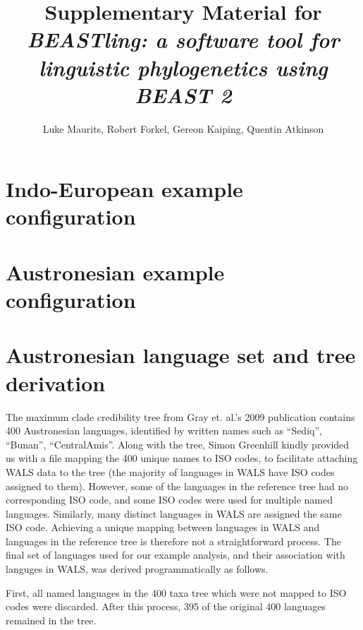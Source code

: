 \documentclass[10pt,a4paper]{article}
\begin{document}
\title{Supplementary Material for \emph{BEASTling: a software tool for linguistic phylogenetics using BEAST 2}}
\author{Luke Maurits, Robert Forkel, Gereon Kaiping, Quentin Atkinson}
\maketitle

\section{Indo-European example configuration}

\begin{alltt}

\end{alltt}

\section{Austronesian example configuration}

\begin{alltt}

\end{alltt}

\section{Austronesian language set and tree derivation}

The maximum clade credibility tree from Gray et. al.'s 2009 publication contains 400 Austronesian languages, identified by written names such as ``Sediq'', ``Bunan'', ``CentralAmis''.  Along with the tree, Simon Greenhill kindly provided us with a file mapping the 400 unique names to ISO codes, to facilitate attaching WALS data to the tree (the majority of languages in WALS have ISO codes assigned to them).  However, some of the languages in the reference tree had no corresponding ISO code, and some ISO codes were used for multiple named languages.  Similarly, many distinct languages in WALS are assigned the same ISO code.  Achieving a unique mapping between languages in WALS and languages in the reference tree is therefore not a straightforward process.  The final set of languages used for our example analysis, and their association with languges in WALS, was derived programmatically as follows.

First, all named languages in the 400 taxa tree which were not mapped to ISO codes were discarded.  After this process, 395 of the original 400 languages remained in the tree.
\end{document}
